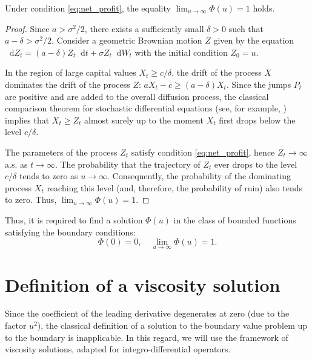 \documentclass[smallextended]{svjour3}
\providecommand{\diff}{\mathop{}\!\mathrm{d}}
\begin{document}
\begin{lemma}
\label{lem:boundary_inf}
Under condition \eqref{eq:net_profit}, the equality $\lim_{u \to \infty} \Phi(u) = 1$ holds.
\end{lemma}

\begin{proof}
Since $a > \sigma^2/2$, there exists a sufficiently small $\delta > 0$ such that $a - \delta > \sigma^2/2$. Consider a geometric Brownian motion $Z$ given by the equation $\diff Z_t = (a - \delta)Z_t \diff t + \sigma Z_t \diff W_t$ with the initial condition $Z_0 = u$. 

In the region of large capital values $X_t \ge c/\delta$, the drift of the process $X$ dominates the drift of the process $Z$: $a X_t - c \ge (a-\delta)X_t$. Since the jumps $P_t$ are positive and are added to the overall diffusion process, the classical comparison theorem for stochastic differential equations (see, for example, \cite[Chapter VI, Theorem 1.1]{IkedaWatanabe1981}) implies that $X_t \ge Z_t$ almost surely up to the moment $X_t$ first drops below the level $c/\delta$. 

The parameters of the process $Z_t$ satisfy condition \eqref{eq:net_profit}, hence $Z_t \to \infty$ a.s. as $t \to \infty$. The probability that the trajectory of $Z_t$ ever drops to the level $c/\delta$ tends to zero as $u \to \infty$. Consequently, the probability of the dominating process $X_t$ reaching this level (and, therefore, the probability of ruin) also tends to zero. Thus, $\lim_{u \to \infty} \Phi(u) = 1$.
\end{proof}

Thus, it is required to find a solution $\Phi(u)$ in the class of bounded functions satisfying the boundary conditions:
\begin{equation}
\label{eq:boundary_conditions}
\Phi(0) = 0, \quad \lim_{u \to \infty} \Phi(u) = 1.
\end{equation}

\section{Definition of a viscosity solution}
\label{sec:viscosity_definition}

Since the coefficient of the leading derivative degenerates at zero (due to the factor $u^2$), the classical definition of a solution to the boundary value problem up to the boundary is inapplicable. In this regard, we will use the framework of viscosity solutions, adapted for integro-differential operators.
\end{document}
